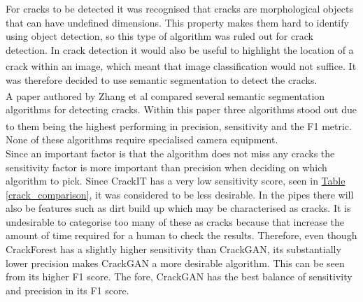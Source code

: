 \documentclass[11pt]{article}		%
\newcommand{\supercite}[1]{\textsuperscript{\cite{#1}}}		%
\newcommand{\tableref}[1]{\hyperref[#1]{Table \ref*{#1}}}     %
\begin{document}
		For cracks to be detected it was recognised that cracks are morphological objects that can have undefined dimensions. This property makes them hard to identify using object detection, so this type of algorithm was ruled out for crack detection. In crack detection it would also be useful to highlight the location of a crack within an image, which meant that image classification would not suffice.\supercite{morphological} It was therefore decided to use semantic segmentation to detect the cracks. 
		\\
        \hspace*{3ex}A paper authored by Zhang et al\supercite{CrackGAN1} compared several semantic segmentation algorithms for detecting cracks. Within this paper three algorithms stood out due to them being the highest performing in precision, sensitivity and the F1 metric.\supercite{CrackGAN1} None of these algorithms require specialised camera equipment.
        \\
        \hspace*{3ex}Since an important factor is that the algorithm does not miss any cracks the sensitivity factor is more important than precision when deciding on which algorithm to pick. Since CrackIT has a very low sensitivity score, seen in \tableref{crack_comparison}, it was considered to be less desirable. In the pipes there will also be features such as dirt build up which may be characterised as cracks. It is undesirable to categorise too many of these as cracks because that increase the amount of time required for a human to check the results. Therefore, even though CrackForest has a slightly higher sensitivity than CrackGAN, its substantially lower precision makes CrackGAN a more desirable algorithm. This can be seen from its higher F1 score. The fore, CrackGAN has the best balance of sensitivity and precision in its F1 score. 
            	        	       
\end{document}
